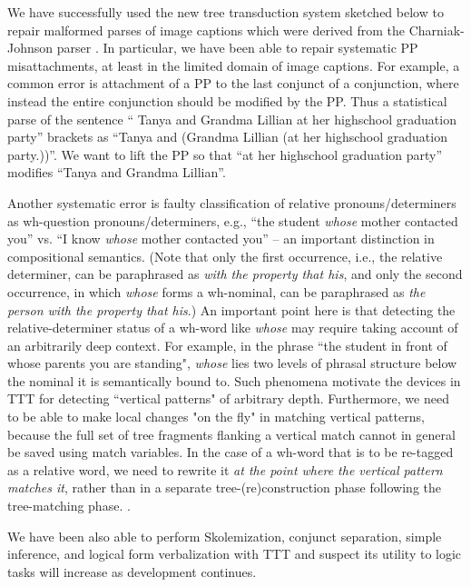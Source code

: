 \documentclass[11pt]{article}
\begin{document}
We have successfully used the new tree transduction system sketched below to repair malformed parses of image captions which were derived from the Charniak-Johnson parser \cite{Charniak-Johnson:2005}. In particular, we have been able to repair systematic PP misattachments, at least in the limited domain of image captions. For example, a common error is attachment of a PP to the last conjunct of a conjunction, where instead the entire conjunction should be modified by the PP.  Thus a statistical parse of the sentence `` Tanya and Grandma Lillian at her highschool graduation party'' brackets as ``Tanya and (Grandma Lillian (at her highschool graduation party.))''.  We want to lift the PP so that ``at her highschool graduation party'' modifies ``Tanya and Grandma Lillian''.

Another systematic error is faulty classification of relative pronouns/determiners as wh-question pronouns/determiners, e.g., ``the student {\it whose} mother contacted you'' vs. ``I know {\it whose} mother contacted you'' -- an important distinction in compositional semantics. (Note that only the first occurrence, i.e., the relative determiner, can be paraphrased as {\it with the property that his}, and only the second occurrence, in which {\it whose} forms a wh-nominal, can be paraphrased as {\it the person with the property that his}.) An important point here is that detecting the relative-determiner status of a wh-word like {\it whose} may require taking account of an arbitrarily deep context. For example, in the phrase ``the student in front of whose parents you are standing", {\it whose} lies two levels of phrasal structure below the nominal it is semantically bound to. Such phenomena motivate the devices in TTT for detecting ``vertical patterns" of arbitrary depth. Furthermore, we need to be able to make local changes "on the fly" in matching vertical patterns, because the full set of tree fragments flanking a vertical match cannot in general be saved using match variables. In the case of a wh-word that is to be re-tagged as a relative word, we need to rewrite it {\it at the point where the vertical pattern matches it}, rather than in a separate tree-(re)construction phase following the tree-matching phase.
. 

We have been also able to perform Skolemization, conjunct separation, simple inference, and logical form verbalization with TTT and suspect its utility to logic tasks will increase as development continues.
\end{document}
